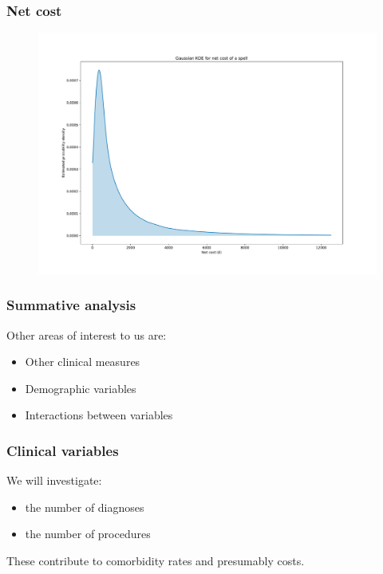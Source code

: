 \documentclass{beamer}
\begin{document}
\begin{frame}
    \frametitle{Net cost}

    \begin{figure}
    \includegraphics[width=\linewidth]{./img/netcost_kde.pdf}
    \end{figure}
\end{frame}

\begin{frame}
    \frametitle{Summative analysis}
    Other areas of interest to us are:
    \begin{itemize}
        \item Other clinical measures
        \item Demographic variables
        \item Interactions between variables
    \end{itemize}
\end{frame}

\begin{frame}
    \frametitle{Clinical variables}

    We will investigate:
    \begin{itemize}
        \item the number of diagnoses
        \item the number of procedures
    \end{itemize}

    \pause%
    These contribute to comorbidity rates and presumably costs.
\end{frame}
\end{document}
